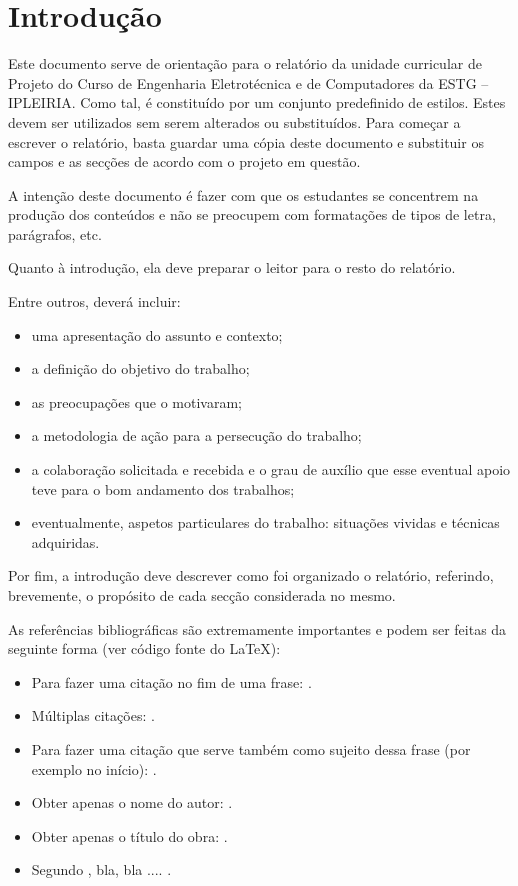 
\chapter{Introdução}
\label{ch:introduction}


Este documento serve de orientação para o relatório da unidade curricular de Projeto do Curso de Engenharia Eletrotécnica e de Computadores da ESTG – IPLEIRIA. Como tal, é constituído por um conjunto predefinido de estilos. Estes devem ser utilizados sem serem alterados ou substituídos. Para começar a escrever o relatório, basta guardar uma cópia deste documento e substituir os campos e as secções de acordo com o projeto em questão.

A intenção deste documento é fazer com que os estudantes se concentrem na produção dos conteúdos e não se preocupem com formatações de tipos de letra, parágrafos, etc.

Quanto à introdução, ela deve preparar o leitor para o resto do relatório.

Entre outros, deverá incluir:
\begin{itemize}
\item uma apresentação do assunto e contexto;
\item a definição do objetivo do trabalho;
\item as preocupações que o motivaram;
\item a metodologia de ação para a persecução do trabalho;
\item a colaboração solicitada e recebida e o grau de auxílio que esse eventual apoio teve para o bom andamento dos trabalhos;
\item eventualmente, aspetos particulares do trabalho: situações vividas e técnicas adquiridas.
\end{itemize}

Por fim, a introdução deve descrever como foi organizado o relatório, referindo, brevemente, o propósito de cada secção considerada no mesmo.

As referências bibliográficas são extremamente importantes e podem ser feitas da seguinte forma (ver código fonte do \LaTeX): 
\begin{itemize}
    \item Para fazer uma citação no fim de uma frase: \parencite{Sims1992}. 
    \item Múltiplas citações: \parencite{Darwin1859,Koza1992}.
    \item Para fazer uma citação que serve também como sujeito dessa frase (por exemplo no início): \textcite{Sims1992}.
    \item Obter apenas o nome do autor: \citeauthor{Sims1992}.
    \item Obter apenas o título do obra: .
    \item Segundo \textcite{Rudolph2016}, bla, bla .... .
\end{itemize}

